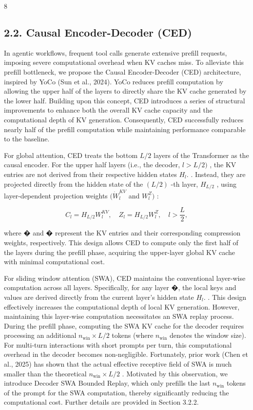\documentclass[
  10
]{article}
\begin{document}
8

\subsection{2.2. Causal Encoder-Decoder
(CED)}\label{causal-encoder-decoder-ced}

In agentic workflows, frequent tool calls generate extensive prefill
requests, imposing severe computational overhead when KV caches miss. To
alleviate this prefill bottleneck, we propose the Causal Encoder-Decoder
(CED) architecture, inspired by YoCo (Sun et al., 2024). YoCo reduces
prefill computation by allowing the upper half of the layers to directly
share the KV cache generated by the lower half. Building upon this
concept, CED introduces a series of structural improvements to enhance
both the overall KV cache capacity and the computational depth of KV
generation. Consequently, CED successfully reduces nearly half of the
prefill computation while maintaining performance comparable to the
baseline.

For global attention, CED treats the bottom \(L / 2\) layers of the
Transformer as the causal encoder. For the upper half layers (i.e., the
decoder, \(l > L / 2 )\) , the KV entries are not derived from their
respective hidden states \(H _ { l } .\) . Instead, they are projected
directly from the hidden state of the \(( L / 2 )\) -th layer,
\(H _ { L / 2 }\) , using layer-dependent projection weights
\(( \dot { W } _ { l } ^ { K V }\) and \(W _ { l } ^ { Z } )\) :

\[
C _ { l } = H _ { L / 2 } W _ { l } ^ { K V } , \quad Z _ { l } = H _ { L / 2 } W _ { l } ^ { Z } , \quad l > \frac { L } { 2 } ,\tag{1}
\]

where � and � represent the KV entries and their corresponding
compression weights, respectively. This design allows CED to compute
only the first half of the layers during the prefill phase, acquiring
the upper-layer global KV cache with minimal computational cost.

For sliding window attention (SWA), CED maintains the conventional
layer-wise computation across all layers. Specifically, for any layer �,
the local keys and values are derived directly from the current layer's
hidden state \(H _ { l } .\) . This design effectively increases the
computational depth of local KV generation. However, maintaining this
layer-wise computation necessitates an SWA replay process. During the
prefill phase, computing the SWA KV cache for the decoder requires
processing an additional \(n _ { \mathrm { w i n } } \times L / 2\)
tokens (where \(n _ { \mathrm { { w i n } } }\) denotes the window
size). For multi-turn interactions with short prompts per turn, this
computational overhead in the decoder becomes non-negligible.
Fortunately, prior work (Chen et al., 2025) has shown that the actual
effective receptive field of SWA is much smaller than the theoretical
\(n _ { \mathrm { w i n } } \times L / 2\) . Motivated by this
observation, we introduce Decoder SWA Bounded Replay, which only
prefills the last \(n _ { \mathrm { w i n } }\) tokens of the prompt for
the SWA computation, thereby significantly reducing the computational
cost. Further details are provided in Section 3.2.2.
\end{document}
